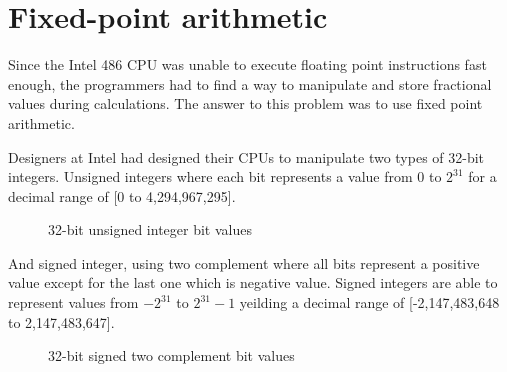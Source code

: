 \section{Fixed-point arithmetic}
Since the Intel 486 CPU was unable to execute floating point instructions fast enough, the programmers had to find a way to manipulate and store fractional values during calculations. The answer to this problem was to use fixed point arithmetic.\\
\par
Designers at Intel had designed their CPUs to manipulate two types of 32-bit integers. Unsigned integers where each bit represents a value from $0$ to $2^{31}$ for a decimal range of [0 to 4,294,967,295].\\
\par
\begin{figure}[H]
 \centering
  
 \caption{32-bit unsigned integer bit values} 
\end{figure}
\par
And signed integer, using two complement where all bits represent a positive value except for the last one which is negative value. Signed integers are able to represent values from $-2^{31}$ to $2^{31}-1$ yeilding a decimal range of [-2,147,483,648 to 2,147,483,647].\\
\par
\begin{figure}[H]
 \centering
  
 \caption{32-bit signed two complement bit values} 
\end{figure}
\par


